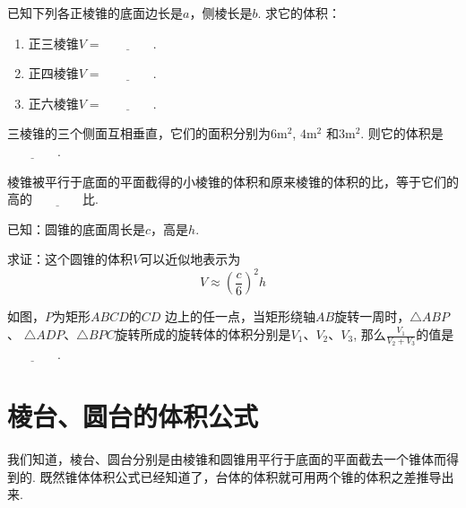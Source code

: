 \begin{enumerate}
\item 已知下列各正棱锥的底面边长是$a$，侧棱长是$b$. 求它的体积：
\begin{enumerate}[(1)]
    \item 正三棱锥$V=\underline{\qquad\qquad}$.
    \item 正四棱锥$V= \underline{\qquad\qquad}$.
    \item 正六棱锥$V= \underline{\qquad\qquad}$.
\end{enumerate}

\item 三棱锥的三个侧面互相垂直，它们的面积分别为$6\mathrm{m}^{2}$,  $4\mathrm{m}^{2}$ 和$3\mathrm{m}^{2}$. 则它的体积是$\underline{\qquad\qquad}$.  

\item 棱锥被平行于底面的平面截得的小棱锥的体积和原来棱锥的体积的比，等于它们的高的$\underline{\qquad\qquad}$比.


\noindent
\begin{minipage}{.6\textwidth}
\item 已知：圆锥的底面周长是$c$，高是$h$.

求证：这个圆锥的体积$V$可以近似地表示为
\[V\approx \left(\frac{c}{6}\right)^{2}h\]


\item 如图，$P$为矩形$ABCD$的$CD$
边上的任一点，当矩形绕轴$AB$旋转一周时，$\triangle ABP$、 $\triangle ADP$、$\triangle BPC$旋转所成的旋转体的体积分别是$V_{1}$、$V_{2}$、$V_{3}$, 那么$\frac{V_{1}}{V_{2}+V_{3}}$的值是$\underline{\qquad\qquad}$.    
\end{minipage}\hfill
\begin{minipage}{.28\textwidth}
    \centering
{}
\end{minipage}


\end{enumerate}


\section{棱台、圆台的体积公式}
我们知道，棱台、圆台分别是由棱锥和圆锥用平行于底面的平面截去一个锥体而得到的. 既然锥体体积公式已经知道了，台体的体积就可用两个锥的体积之差推导出来.

